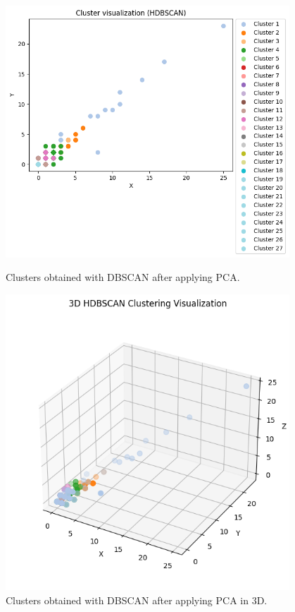 \begin{appendices}
	\begin{figure}[H]
		\centering
		\begin{minipage}[t]{0.48\textwidth}
			\centering
			\includegraphics[width=0.95\textwidth]{../imgs/graphs/clustering/hdbscan_nopca.png}
			\caption{Clusters obtained with DBSCAN after applying PCA.}
			\label{fig:clusters_hdbscan_no_pca}
		\end{minipage}\hfill
		\begin{minipage}[t]{0.48\textwidth}
			\centering
			\includegraphics[width=0.95\textwidth]{../imgs/graphs/clustering/hdbscan_nopca_3d.png}
			\caption{Clusters obtained with DBSCAN after applying PCA in 3D.}
			\label{fig:clusters_hdbscan_no_pca_3d}
		\end{minipage}
	\end{figure}


\end{appendices}
